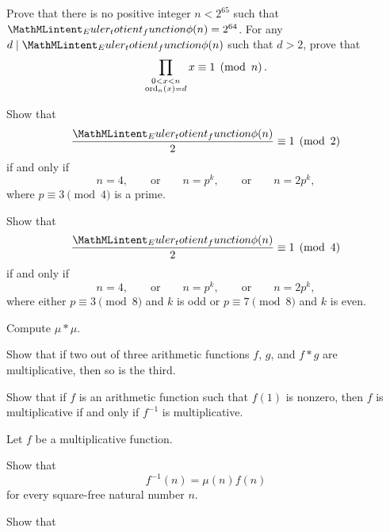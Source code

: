 \begin{routine}
\begin{subexenum}
\begin{equation*}
  \end{equation*}
  \end{subexenum}
  \exercise Prove that there is no positive integer $n<2^{65}$ such that $\totient(n)=2^{64}$.
  \exercise For any $d\mid \totient(n)$ such that $d>2$, prove that
  \begin{equation*}
    \prod_{\substack{0<x<n \\\operatorname{ord}_n(x)=d}}x\equiv 1\mkern5mu\left(\operatorname{mod} \mkern 6mu n\right).
  \end{equation*}
  \exercise 
  \begin{subexenum}
  \item Show that
    \begin{equation*}
      \frac{\totient(n)}{2}\equiv 1\pmod{2}
    \end{equation*}
    if and only if
    \begin{equation*}
      n=4,\qquad\text{or}\qquad n= p^k,\qquad\text{or}\qquad n=2p^k,
    \end{equation*}
    where $p\equiv 3\pmod{4}$ is a prime.
  \item Show that
    \begin{equation*}
      \frac{\totient(n)}{2}\equiv 1\pmod{4}
    \end{equation*}
    if and only if
    \begin{equation*}
      n=4,\qquad\text{or}\qquad n=p^k,\qquad\text{or}\qquad n=2p^k,
    \end{equation*}
    where either $p\equiv 3\pmod{8}$ and $k$ is odd or $p\equiv 7\pmod{8}$ and $k$ is even.
  \end{subexenum}
  \exercise Compute $\mu\ast\mu$.
  \exercise
  \begin{subexenum}
  \item Show that if two out of three arithmetic functions $f$, $g$, and $f\ast g$ are multiplicative, then so is the third.
  \item Show that if $f$ is an arithmetic function such that $f(1)$ is nonzero, then $f$ is multiplicative if and only if $f^{-1}$ is multiplicative.
  \end{subexenum}
  \exercise Let $f$ be a multiplicative function.
  \begin{subexenum}
  \item Show that
    \begin{equation*}
      f^{-1}(n)=\mu(n)f(n)
    \end{equation*}
    for every square-free natural number $n$.
  \item Show that

\end{subexenum}
\end{routine}
